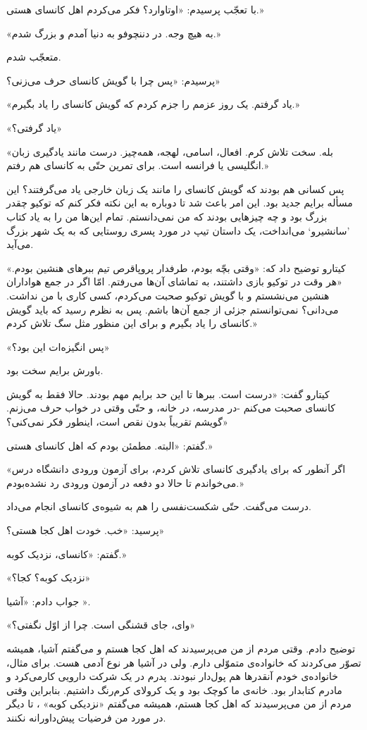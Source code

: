 \documentclass[a5paper]{book}
\begin{document}
با تعجّب پرسیدم: «اوتاوارد؟ فکر می‌کردم اهل کانسای هستی.»

«به هیچ وجه. در دننچوفو به دنیا آمدم و بزرگ شدم.»

متعجّب شدم.

پرسیدم: «پس چرا با گویش کانسای حرف می‌زنی؟»

«یاد گرفتم. یک روز عزمم را جزم کردم که گویش کانسای را یاد بگیرم.»

«یاد گرفتی؟»

«بله. سخت تلاش کرم. افعال، اسامی، لهجه، همه‌چیز. درست مانند یادگیری زبان انگلیسی یا فرانسه است. برای تمرین حتّی به کانسای هم رفتم.»

پس کسانی هم بودند که گویش کانسای را مانند یک زبان خارجی یاد می‌گرفتند؟ این مسأله برایم جدید بود. این امر باعث شد تا دوباره به این نکته فکر کنم که توکیو چقدر بزرگ بود و چه چیزهایی بودند که من نمی‌دانستم.  تمام این‌ها من را به یاد کتاب 'سانشیرو` می‌انداخت، یک داستان تیپ در مورد پسری روستایی که به یک شهر بزرگ می‌آید.

کیتارو توضیح داد که: «وقتی بچّه بودم، طرفدار پروپاقرص تیم ببرهای هنشین بودم.» «هر وقت در توکیو بازی داشتند، به تماشای آن‌ها می‌رفتم. امّا اگر در جمع هواداران هنشین می‌نشستم و با گویش توکیو صحبت می‌کردم، کسی کاری با من نداشت. می‌دانی؟ نمی‌توانستم جزئی از جمع آن‌ها باشم. پس به نظرم رسید که باید گویش کانسای را یاد بگیرم و برای این منظور مثل سگ تلاش کردم.»

«پس انگیزه‌ات این بود؟»

باورش برایم سخت بود.

کیتارو گفت: «درست است. ببرها تا این حد برایم مهم بودند. حالا فقط به گویش کانسای صحبت می‌کنم -در مدرسه، در خانه، و حتّی وقتی در خواب حرف می‌زنم. گویشم تقریباً بدون نقص است، اینطور فکر نمی‌کنی؟»

گفتم: «البته. مطمئن بودم که اهل کانسای هستی.»

«اگر آنطور که برای یادگیری کانسای تلاش کردم، برای آزمون ورودی دانشگاه درس می‌خواندم تا حالا دو دفعه در آزمون ورودی رد نشده‌بودم.»

درست می‌گفت. حتّی شکست‌نفسی را هم به شیوه‌ی کانسای انجام می‌داد.

پرسید: «خب. خودت اهل کجا هستی؟»

گفتم: «کانسای، نزدیک کوبه.»

«نزدیک کوبه؟ کجا؟»

جواب دادم: «آشیا
».


«وای، جای قشنگی است. چرا از اوّل نگفتی؟»

توضیح دادم. وقتی مردم از من می‌پرسیدند که اهل کجا هستم و می‌گفتم آشیا، همیشه تصوّر می‌کردند که خانواده‌ی متموّلی دارم. ولی در آشیا هر نوع آدمی هست. برای مثال، خانواده‌ی خودم آنقدرها هم پول‌دار نبودند. پدرم در یک شرکت دارویی کارمی‌کرد و مادرم کتابدار بود. خانه‌ی ما کوچک بود و یک کرولای کرم‌رنگ داشتیم. بنابراین وقتی مردم از من می‌پرسیدند که اهل کجا هستم، همیشه می‌گفتم «نزدیکی کوبه»
،  تا دیگر در مورد من فرضیات پیش‌داورانه نکنند.
\end{document}
